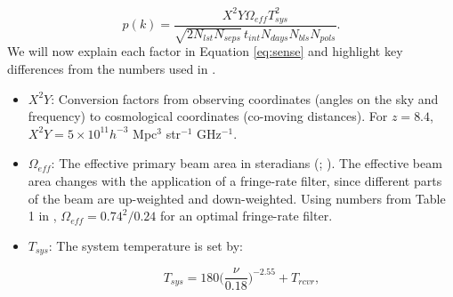 \documentclass[preprint2,numberedappendix,tighten]{aastex6}  %
\begin{document}
\begin{equation}
\label{eq:sense}
p(k) = \frac{X^{2}Y \Omega_{eff} T_{sys}^{2}}{\sqrt{2N_{lst}N_{seps}}\,t_{int}N_{days}N_{bls}N_{pols}}.
\end{equation}
We will now explain each factor in Equation \eqref{eq:sense} and highlight key differences from the numbers used in .

\begin{itemize}
\item $X^{2}Y$: Conversion factors from observing coordinates (angles on the sky and frequency) to cosmological coordinates (co-moving 
distances). For $z=8.4$, $X^{2}Y = 5 \times 10^{11} h^{-3}$ Mpc$^{3}$ str$^{-1}$ GHz$^{-1}$.
\item $\Omega_{eff}$: The effective primary beam area in steradians (\citealt{parsons_et_al2010}; \citealt{pober_et_al2012}). 
The effective beam area changes with the application of a fringe-rate filter, since different parts of the beam are up-weighted and down-weighted. Using numbers from Table 1 in \citet{parsons_et_al2016}, $\Omega_{eff} = 0.74^{2}/0.24$ for an optimal fringe-rate 
filter. 
\item $T_{sys}$: The system temperature is set by:

\begin{equation}
\label{eq:sys}
T_{sys} = 180\Big(\frac{\nu}{0.18}\Big)^{-2.55} + T_{rcvr},
\end{equation}


\end{itemize}
\end{document}
